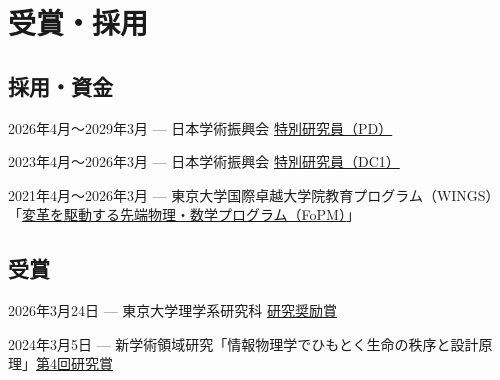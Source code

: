 \documentclass[11pt,a4paper,uplatex,nomag,dvipdfmx]{jsarticle}
\newcommand{\je}[2]{#1}
\newcommand{\je}[2]{#2}
\begin{document}



\section{\je{受賞・採用}{Fellowships \& Awards}}


\subsection{\je{採用・資金}{Competitive fellowships and funding}}

\je
{2026年4月〜2029年3月}
{Apr.~2026--Mar.~2029} 
--- 
\je
{日本学術振興会 \href{https://www.jsps.go.jp/j-pd/index.html}{特別研究員（PD）}}
{\href{https://www.jsps.go.jp/english/e-pd/index.html}{Research Fellowship for Young Scientists (PD)}, Japan Society for the Promotion of Science (JSPS).}


\je
{2023年4月〜2026年3月}
{Apr.~2023--Mar.~2026} 
--- 
\je
{日本学術振興会 \href{https://www.jsps.go.jp/j-pd/index.html}{特別研究員（DC1）}}
{\href{https://www.jsps.go.jp/english/e-pd/index.html}{Research Fellowship for Young Scientists (DC1)}, Japan Society for the Promotion of Science (JSPS).}

\je
{2021年4月〜2026年3月}
{Apr.~2021--Mar.~2026} 
--- 
\je
{東京大学国際卓越大学院教育プログラム（WINGS）「\href{https://www.s.u-tokyo.ac.jp/ja/FoPM/}{変革を駆動する先端物理・数学プログラム（FoPM）}」}
{\href{https://www.s.u-tokyo.ac.jp/en/FoPM/}{Forefront Physics and Mathematics Program to Drive Transformation (FoPM)}, a World-leading Innovative Graduate Study (WINGS) Program, The University of Tokyo.}



\subsection{\je{受賞}{Honors and awards}}


\je
{2026年3月24日}
{Mar.~24, 2026} 
---
\je
{東京大学理学系研究科 \href{https://www.phys.s.u-tokyo.ac.jp/award/48927/}{研究奨励賞}}
{\href{https://www.phys.s.u-tokyo.ac.jp/award/48927/}{The School of Science Encouragement Award (Doctoral program)}, Graduate School of Science, The University of Tokyo}


\je
{2024年3月5日}
{Mar.~5, 2024}
---
\je
{新学術領域研究「情報物理学でひもとく生命の秩序と設計原理」\href{https://infophys-bio.jp/award}{第4回研究賞}}
{\href{https://infophys-bio.jp/award}{Research award}, Grant-in-Aid for Scientific Research on Innovative Areas: ``Information physics of living matters''}
\end{document}
